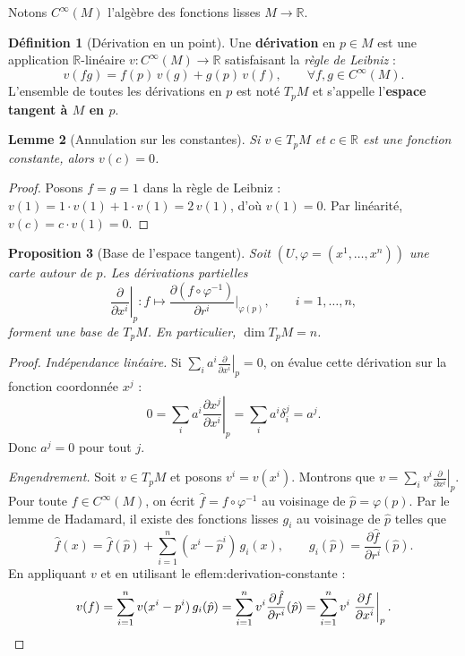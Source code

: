 \documentclass[12pt,a4paper,openany]{book}
\theoremstyle{definition}
\newtheorem{definition}{Définition}[chapter]
\theoremstyle{plain}
\newtheorem{proposition}[definition]{Proposition}
\newtheorem{lemme}[definition]{Lemme}
\theoremstyle{remark}
\newcommand{\R}{\mathbb{R}}
\begin{document}
Notons $C^\infty(M)$ l'algèbre des fonctions lisses $M \to \R$.

\begin{definition}[Dérivation en un point]\label{def:derivation}
Une \textbf{dérivation} en $p \in M$ est une application
$\R$-linéaire $v : C^\infty(M) \to \R$ satisfaisant la \emph{règle de Leibniz} :
\[
  v(fg) = f(p)\,v(g) + g(p)\,v(f), \qquad \forall f,g \in C^\infty(M).
\]
L'ensemble de toutes les dérivations en $p$ est noté $T_pM$
et s'appelle l'\textbf{espace tangent à $M$ en $p$}.
\end{definition}

\begin{lemme}[Annulation sur les constantes]\label{lem:derivation-constante}
Si $v \in T_pM$ et $c \in \R$ est une fonction constante, alors $v(c) = 0$.
\end{lemme}

\begin{proof}
Posons $f = g = 1$ dans la règle de Leibniz :
$v(1) = 1 \cdot v(1) + 1 \cdot v(1) = 2\,v(1)$, d'où $v(1) = 0$.
Par linéarité, $v(c) = c \cdot v(1) = 0$.
\end{proof}

\begin{proposition}[Base de l'espace tangent]\label{prop:base-tangent}
Soit $(U, \varphi = (x^1, \ldots, x^n))$ une carte autour de $p$.
Les dérivations partielles
\[
  \left.\frac{\partial}{\partial x^i}\right|_p : f \longmapsto
  \frac{\partial (f \circ \varphi^{-1})}{\partial r^i}\bigg|_{\varphi(p)},
  \qquad i = 1, \ldots, n,
\]
forment une base de $T_pM$. En particulier, $\dim T_pM = n$.
\end{proposition}

\begin{proof}
\emph{Indépendance linéaire.}
Si $\sum_i a^i \left.\frac{\partial}{\partial x^i}\right|_p = 0$, on évalue
cette dérivation sur la fonction coordonnée $x^j$ :
\[
  0 = \sum_i a^i \left.\frac{\partial x^j}{\partial x^i}\right|_p
    = \sum_i a^i \delta^j_i = a^j.
\]
Donc $a^j = 0$ pour tout $j$.

\emph{Engendrement.}
Soit $v \in T_pM$ et posons $v^i = v(x^i)$. Montrons que
$v = \sum_i v^i \left.\frac{\partial}{\partial x^i}\right|_p$.
Pour toute $f \in C^\infty(M)$, on écrit $\hat{f} = f \circ \varphi^{-1}$ au voisinage
de $\hat{p} = \varphi(p)$. Par le lemme de Hadamard,
il existe des fonctions lisses $g_i$ au voisinage de $\hat{p}$ telles que
\[
  \hat{f}(x) = \hat{f}(\hat{p}) + \sum_{i=1}^n (x^i - \hat{p}^i)\,g_i(x),
  \qquad g_i(\hat{p}) = \frac{\partial \hat{f}}{\partial r^i}(\hat{p}).
\]
En appliquant $v$ et en utilisant le 
ef{lem:derivation-constante} :
\[
  v(f) = \sum_{i=1}^n v(x^i - p^i)\,g_i(\hat{p})
       = \sum_{i=1}^n v^i \frac{\partial \hat{f}}{\partial r^i}(\hat{p})
       = \sum_{i=1}^n v^i \left.\frac{\partial f}{\partial x^i}\right|_p. \qedhere
\]
\end{proof}
\end{document}
